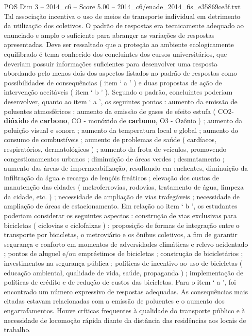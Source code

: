 \begin{textsample}{POS Dim 3 – 2014\_c6 – Score 5.00 – 2014\_c6/enade\_2014\_fis\_e35869ce3f.txt}
Tal associação incentiva o uso de meios de transporte individual em detrimento da utilização dos coletivos.
O padrão de respostas era tecnicamente adequado ao enunciado e amplo o suficiente para abranger as variações de respostas apresentadas.
Deve ser ressaltado que a proteção ao ambiente ecologicamente equilibrado é tema conhecido dos concluintes dos cursos universitários, que deveriam possuir informações suficientes para desenvolver uma resposta abordando pelo menos dois dos aspectos listados no padrão de respostas como possibilidades de consequências ( item ‘ a ’ ) e duas propostas de ação de intervenção aceitáveis ( item ‘ b ’ ).
Segundo o padrão, concluintes poderiam desenvolver, quanto ao item ‘ a ’, os seguintes pontos : aumento da emissão de poluentes atmosféricos ; aumento da emissão de gases de efeito estufa ( CO2- \textbf{dióxido} de \textbf{carbono}, CO - monóxido de \textbf{carbono}, O3 - Ozônio ) ; aumento da poluição visual e sonora ; aumento da temperatura local e global ; aumento do consumo de combustíveis ; aumento de problemas de saúde ( cardíacos, respiratórios, dermatológicos ) ; aumento da frota de veículos, promovendo congestionamentos urbanos ; diminuição de áreas verdes ; desmatamento ; aumento das áreas de impermeabilização, resultando em enchentes, diminuição da infiltração da água e recarga de lençóis freáticos ; elevação dos custos de manutenção das cidades ( metroferrovias, rodovias, tratamento de água, limpeza da cidade, etc. ) ; necessidade de ampliação de vias trafegáveis ; necessidade de ampliação de áreas de estacionamento.
Em relação ao item ‘ b ’, os estudantes poderiam considerar os seguintes aspectos : construção de vias exclusivas para bicicletas ( ciclovias e ciclofaixas ) ; proposição de formas de integração entre o transporte por bicicletas, o metroviário e os ônibus coletivos, a fim de garantir segurança e conforto em momentos de adversidades climáticas e relevo acidentado ; pontos de aluguel e/ou empréstimos de bicicletas ; construção de bicicletários ; investimentos na segurança pública ; políticas de incentivo ao uso de bicicletas ( educação ambiental, qualidade de vida, saúde, propaganda ) ; implementação de políticas de crédito e de redução de custos das bicicletas.
Para o item ‘ a ’, foi encontrado um número expressivo de respostas adequadas.
As consequências mais citadas estavam relacionadas com a emissão de poluentes e o aumento dos engarrafamentos.
Houve críticas frequentes à qualidade do transporte público e à necessidade de locomoção rápida diante da distância das residências aos locais de trabalho.

\end{textsample}
